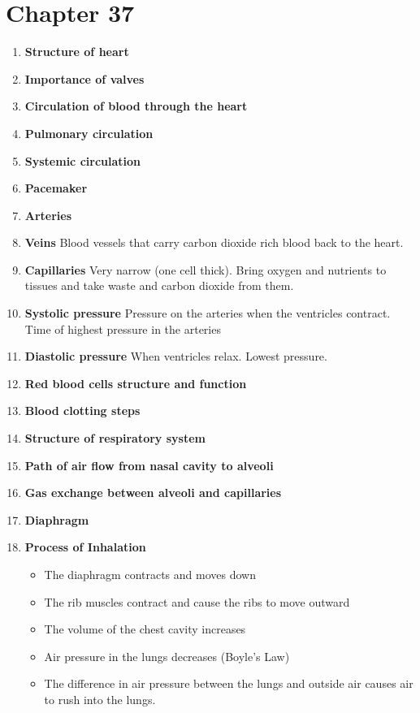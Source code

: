 \documentclass[9pt]{article}
\begin{document}
\section*{Chapter 37}
\begin{enumerate}
  \item {\bf Structure of heart}
  \item {\bf Importance of valves}
  \item {\bf Circulation of blood through the heart}
  \item {\bf Pulmonary circulation}
  \item {\bf Systemic circulation}
  \item {\bf Pacemaker}
  \item {\bf Arteries}
  \item {\bf Veins} Blood vessels that carry carbon dioxide rich blood
    back to the heart.
  \item {\bf Capillaries} Very narrow (one cell thick). Bring oxygen
    and nutrients to tissues and take waste and carbon dioxide from
    them.
  \item {\bf Systolic pressure} Pressure on the arteries when the
    ventricles contract. Time of highest pressure in the arteries
  \item {\bf Diastolic pressure} When ventricles relax. Lowest
    pressure.
  \item {\bf Red blood cells structure and function}
  \item {\bf Blood clotting steps}
  \item {\bf Structure of respiratory system}
  \item {\bf Path of air flow from nasal cavity to alveoli}
  \item {\bf Gas exchange between alveoli and capillaries}
  \item {\bf Diaphragm}
  \item {\bf Process of Inhalation}
    \begin{itemize}
      \item The diaphragm contracts and moves down
      \item The rib muscles contract and cause the ribs to move outward
      \item The volume of the chest cavity increases
      \item Air pressure in the lungs decreases (Boyle’s Law)
      \item The difference in air pressure between the lungs and
        outside air causes air to rush into the lungs.
    \end{itemize}

\end{enumerate}
\end{document}
